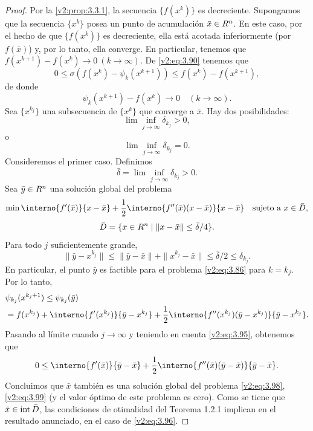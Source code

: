 \begin{proof}
    Por la \cref{v2:prop:3.3.1}, la secuencia $\{f(x^k)\}$ es decreciente. Supongamos que la secuencia $\{x^k\}$ posea un punto de acumulación $\bar{x} \in R^n$. En este caso, por el hecho de que $\{f(x^k)\}$ es decreciente, ella está acotada inferiormente (por $f(\bar{x})$) y, por lo tanto, ella converge. En particular, tenemos que $f(x^{k+1}) - f(x^k) \to 0 \ (k \to \infty)$. De \eqref{v2:eq:3.90} tenemos que
    \[
        0 \le \sigma (f(x^k) - \psi_k(x^{k+1})) \le f(x^k) - f(x^{k+1}),
    \]
    de donde
    \begin{equation}
        \psi_k(x^{k+1}) - f(x^k) \to 0 \quad (k \to \infty).
        \label{v2:eq:3.95}
    \end{equation}
    Sea $\{x^{k_j}\}$ una subsecuencia de $\{x^k\}$ que converge a $\bar{x}$. Hay dos posibilidades:
    \begin{equation}
        \lim \inf_{j \to \infty} \delta_{k_j} > 0,
        \label{v2:eq:3.96}
    \end{equation}
    o
    \begin{equation}
        \lim \inf_{j \to \infty} \delta_{k_j} = 0.
        \label{v2:eq:3.97}
    \end{equation}
    Consideremos el primer caso. Definimos
    \[
        \bar{\delta} = \lim \inf_{j \to \infty} \delta_{k_j} > 0.
    \]
    Sea $\bar{y} \in R^n$ una solución global del problema
    \begin{equation}
        \min \interno{f'(\bar{x})}{x - \bar{x}} + \frac{1}{2}\interno{f''(\bar{x})(x - \bar{x})}{x - \bar{x}} \quad \text{sujeto a } x \in \bar{D},
        \label{v2:eq:3.98}
    \end{equation}
    \begin{equation}
        \bar{D} = \{x \in R^n \mid \|x - \bar{x}\| \le \bar{\delta} / 4\}.
        \label{v2:eq:3.99}
    \end{equation}
    Para todo $j$ suficientemente grande,
    \[
        \|\bar{y} - x^{k_j}\| \le \|\bar{y} - \bar{x}\| + \|x^{k_j} - \bar{x}\| \le \bar{\delta}/2 \le \delta_{k_j}.
    \]
    En particular, el punto $\bar{y}$ es factible para el problema \eqref{v2:eq:3.86} para $k = k_j$. Por lo tanto,
    \begin{align*}
        &\psi_{k_j}(x^{k_j+1}) \le \psi_{k_j}(\bar{y}) \\
        &= f(x^{k_j}) + \interno{f'(x^{k_j})}{\bar{y} - x^{k_j}} + \frac{1}{2}\interno{f''(x^{k_j})(\bar{y} - x^{k_j})}{\bar{y} - x^{k_j}}.
    \end{align*}
    Pasando al límite cuando $j \to \infty$ y teniendo en cuenta \eqref{v2:eq:3.95}, obtenemos que
    \[
        0 \le \interno{f'(\bar{x})}{\bar{y} - \bar{x}} + \frac{1}{2}\interno{f''(\bar{x})(\bar{y} - \bar{x})}{\bar{y} - \bar{x}}.
    \]
    Concluimos que $\bar{x}$ también es una solución global del problema \eqref{v2:eq:3.98}, \eqref{v2:eq:3.99} (y el valor óptimo de este problema es cero). Como se tiene que $\bar{x} \in \operatorname{\operatorname{int}} \bar{D}$, las condiciones de otimalidad del Teorema 1.2.1 implican en el resultado anunciado, en el caso de \eqref{v2:eq:3.96}.
    

\end{proof}
